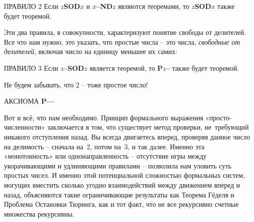 \documentclass[../main.tex]{subfiles}
\begin{document}
\begin{mybox}{ПРАВИЛО 2}
    Если \textbf{$z$SOD$x$} и \textbf{$x$--ND$z$} являются теоремами, то \textbf{$z$SOD$x$} также будет теоремой.
\end{mybox}

Эти два правила, в совокупности, характеризуют понятие свободы от делителей. Все что нам нужно, это указать, что простые числа \--- это числа, \emph{свободные от делителей}, включая число на единицу меньшее их самих:

\begin{mybox}{ПРАВИЛО 3}
    Если \textbf{$z$--SOD$z$} является теоремой, то \textbf{P$z$--} также будет теоремой.
\end{mybox}

Не будем забывать, что 2 \--- тоже простое число!

\begin{mybox}{АКСИОМА}
    \textbf{P--{}--}
\end{mybox}

Вот и всё, что нам необходимо. Принцип формального выражения «просто-численности» заключается в том, что существует метод проверки, не~требующий никакого отступления назад. Вы всегда двигаетесь вперед, проверяя данное число на делимость \--- сначала на~2, потом на~3, и так далее. Именно эта «монотонность» или однонаправленность \--- отсутствие игры между укорачивающими и удлиняющими правилами \--- позволила нам уловить суть простых чисел. И именно этой потенциальной сложностью формальных систем, могущих вместить сколько угодно взаимодействий между движением вперед и назад, объясняются такие ограничивающие результаты как Теорема Гёделя и Проблема Остановки Тюринга, как и тот факт, что не все рекурсивно счетные множества рекурсивны.
\end{document}
